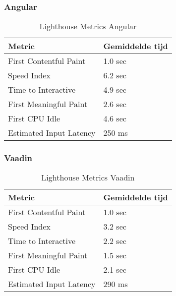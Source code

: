 \subsubsection{Angular}
\begin{table}[H]
	\begin{tabular}{|l|l|}
		\hline
		\textbf{Metric}         & \textbf{Gemiddelde tijd} \\ \hline
		First Contentful Paint  & 1.0 sec                  \\ \hline
		Speed Index             & 6.2 sec                  \\ \hline
		Time to Interactive     & 4.9 sec                  \\ \hline
		First Meaningful Paint  & 2.6 sec                  \\ \hline
		First CPU Idle          & 4.6 sec                  \\ \hline
		Estimated Input Latency & 250 ms                   \\ \hline
	\end{tabular}
\caption{Lighthouse Metrics Angular}
\label{table:angularLighthouse}
\end{table}
\subsubsection{Vaadin}

\begin{table}[H]
	\begin{tabular}{|l|l|}
		\hline
		\textbf{Metric}         & \textbf{Gemiddelde tijd} \\ \hline
		First Contentful Paint  & 1.0 sec                  \\ \hline
		Speed Index             & 3.2 sec                  \\ \hline
		Time to Interactive     & 2.2 sec                  \\ \hline
		First Meaningful Paint  & 1.5 sec                  \\ \hline
		First CPU Idle          & 2.1 sec                  \\ \hline
		Estimated Input Latency & 290 ms                   \\ \hline
	\end{tabular}
\caption{Lighthouse Metrics Vaadin}
\label{table:vaadinLighthouse}
\end{table}

